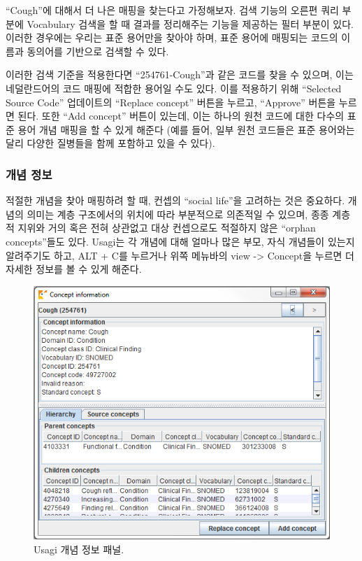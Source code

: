 \documentclass[11pt]{book}
\theoremstyle{definition}
\theoremstyle{definition}
\theoremstyle{definition}
\theoremstyle{remark}
\begin{document}
``Cough''에 대해서 더 나은 매핑을 찾는다고 가정해보자. 검색 기능의
오른편 쿼리 부분에 Vocabulary 검색을 할 때 결과를 정리해주는 기능을
제공하는 필터 부분이 있다. 이러한 경우에는 우리는 표준 용어만을 찾아야
하며, 표준 용어에 매핑되는 코드의 이름과 동의어를 기반으로 검색할 수
있다.

이러한 검색 기준을 적용한다면 ``254761-Cough''과 같은 코드를 찾을 수
있으며, 이는 네덜란드어의 코드 매핑에 적합한 용어일 수도 있다. 이를
적용하기 위해 ``Selected Source Code'' 업데이트의 ``Replace concept''
버튼을 누르고, ``Approve'' 버튼을 누르면 된다. 또한 ``Add concept''
버튼이 있는데, 이는 하나의 원천 코드에 대한 다수의 표준 용어 개념 매핑을
할 수 있게 해준다 (예를 들어, 일부 원천 코드들은 표준 용어와는 달리
다양한 질병들을 함께 포함하고 있을 수 있다).

\subsubsection*{개념 정보}\label{-}

적절한 개념을 찾아 매핑하려 할 때, 컨셉의 ``social life''을 고려하는
것은 중요하다. 개념의 의미는 계층 구조에서의 위치에 따라 부분적으로
의존적일 수 있으며, 종종 계층적 지위와 거의 혹은 전혀 상관없고 대상
컨셉으로도 적절하지 않은 ``orphan concepts''들도 있다. Usagi는 각 개념에
대해 얼마나 많은 부모, 자식 개념들이 있는지 알려주기도 하고, ALT + C를
누르거나 위쪽 메뉴바의 view -\textgreater{} Concept을 누르면 더 자세한
정보를 볼 수 있게 해준다.

\begin{figure}

{\centering \includegraphics[width=1\linewidth]{images/ExtractTransformLoad/usagiConceptInfo} 

}

\caption{Usagi 개념 정보 패널.}\label{fig:usagiConceptInfo}
\end{figure}
\end{document}
